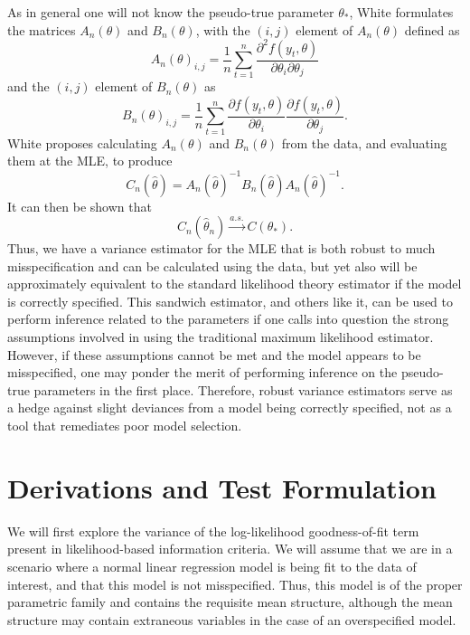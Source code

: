 \documentclass[12pt]{article} %
\theoremstyle{definition}
\begin{document}
		As in general one will not know the pseudo-true parameter $\theta_*$, White formulates the matrices $A_n(\theta)$ and $B_n(\theta)$, with the $(i,j)$ element of $A_n(\theta)$ defined as
		\begin{equation*}
			A_n(\theta)_{i,j} = \frac{1}{n} \sum_{t=1}^{n} \frac{\partial^2 f(y_t,\theta)}{\partial \theta_i \partial \theta_j}
		\end{equation*}
		and the $(i,j)$ element of $B_n(\theta)$ as
		\begin{equation*}
			B_n(\theta)_{i,j} = \frac{1}{n} \sum_{t=1}^{n} \frac{\partial f(y_t,\theta)}{\partial \theta_i} \frac{\partial f(y_t,\theta)}{\partial \theta_j} .
		\end{equation*}
		White proposes calculating $A_n(\theta)$ and $B_n(\theta)$ from the data, and evaluating them at the MLE, to produce
		\begin{equation*}
			C_n(\hat{\theta}) = A_n(\hat{\theta})^{-1} B_n(\hat{\theta}) A_n(\hat{\theta})^{-1} .
		\end{equation*}
		It can then be shown that 
		\begin{equation*}
			C_n(\hat{\theta}_n) \xrightarrow[]{a.s.} C(\theta_* ) .
		\end{equation*}
		Thus, we have a variance estimator for the MLE that is both robust to much misspecification and can be calculated using the data, but yet also will be approximately equivalent to the standard
		likelihood theory estimator if the model is correctly specified. This sandwich estimator, and others like it, can be used to perform inference related to the parameters if one calls into question
		the strong assumptions involved in using the traditional maximum likelihood estimator. However, if these assumptions cannot be met and the model appears to be misspecified, one may ponder
		the merit of performing inference on the pseudo-true parameters in the first place. Therefore, robust variance estimators serve as a hedge against slight deviances from a model
		being correctly specified, not as a tool that remediates poor model selection.

\section{Derivations and Test Formulation}

		We will first explore the variance of the log-likelihood goodness-of-fit term present in likelihood-based information criteria. We will assume that we are in a
		scenario where a normal linear regression model is being fit to the data of interest, and that this model is not misspecified. Thus, this model is of the proper
		parametric family and contains the requisite mean structure, although the mean structure may contain extraneous variables in the
		case of an overspecified model.
\end{document}
